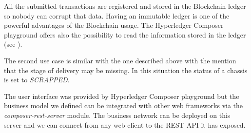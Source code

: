 

All the submitted transactions are registered and stored in the Blockchain ledger so nobody can corrupt that data. Having an immutable ledger is one of the powerful advantages of the Blockchain usage. The Hyperledger Composer playground offers also the possibility to read the information stored in the ledger (see ).
\\

The second use case is similar with the one described above with the mention that the stage of delivery may be missing. In this situation the status of a chassis is set to \emph{SCRAPPED}.

The user interface was provided by Hyperledger Composer playground but the business model we defined can be integrated with other web frameworks via the \emph{composer-rest-server} module. The business network can be deployed on this server and we can connect from any web client to the REST API it has exposed.
